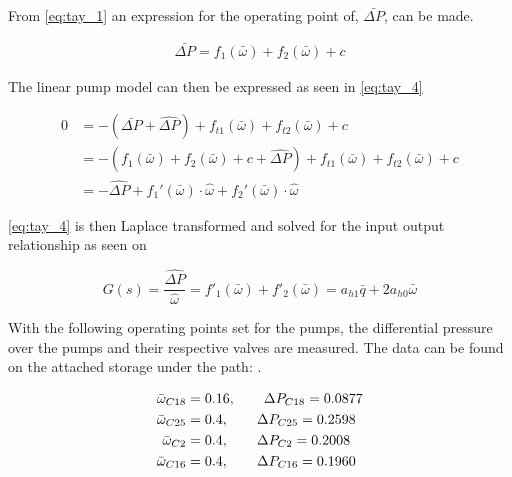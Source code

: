 From \eqref{eq:tay_1} an expression for the operating point of, $\bar{\Delta P}$, can be made.

\begin{equation}
\begin{split}
\bar{\Delta P} = f_{1}(\bar{\omega}) + f_{2}(\bar{\omega}) + c
\end{split}
\label{eq:tay_3}
\end{equation}

The linear pump model can then be expressed as seen in \eqref{eq:tay_4}

\begin{equation}
\begin{split}
0 &= -(\bar{\Delta P} + \hat{\Delta P}) + f_{t1}(\bar{\omega}) + f_{t2}(\bar{\omega}) + c\\
  &= -(f_{1}(\bar{\omega}) + f_{2}(\bar{\omega}) + c + \hat{\Delta P}) + f_{t1}(\bar{\omega}) + f_{t2}(\bar{\omega}) + c \\ 
  &= -\hat{\Delta P} + f_1'(\bar{\omega})\cdot\hat{\omega} + f_2'(\bar{\omega})\cdot\hat{\omega}
\end{split}
\label{eq:tay_4}
\end{equation}

\eqref{eq:tay_4} is then Laplace transformed and solved for the input output relationship as seen on 

\begin{equation}
G(s) = \frac{\hat{\Delta P}}{\hat{\omega}} = f'_1(\bar{\omega}) + f'_2(\bar{\omega}) = a_{h1}\bar{q} + 2a_{h0}\bar{\omega}
\label{eq:lin_pump_simon}
\end{equation}

With the following operating points set for the pumps, the differential pressure over the pumps and their respective valves are measured. 
The data can be found on the attached storage under the path: .

\begin{equation}
\centering
	\begin{split}
	\bar{\omega}_{C18} &= 0.16,\hspace{20pt} \Delta P_{C18} = 0.0877 \\
	\bar{\omega}_{C25} &= 0.4,\hspace{20pt} \Delta P_{C25} = 0.2598  \\
	\bar{\omega}_{C2}  &= 0.4,\hspace{20pt} \Delta P_{C2} = 0.2008 \\
	\bar{\omega}_{C16} &= 0.4,\hspace{20pt} \Delta P_{C16} =0.1960 
	\end{split}
\end{equation}



